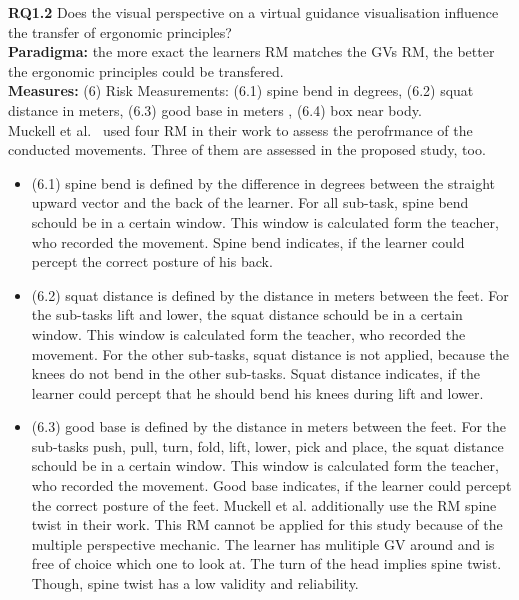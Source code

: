 \textbf{RQ1.2} Does the visual perspective on a virtual guidance visualisation influence the transfer of ergonomic principles?\\
\textbf{Paradigma:} the more exact the learners RM matches the GVs RM, the better the ergonomic principles could be transfered.\\
\textbf{Measures:} (6) Risk Measurements: (6.1) spine bend in degrees, (6.2) squat distance in meters, (6.3) good base in meters , (6.4) box near body.\\
Muckell et al.~\cite{muckell} used four RM in their work to assess the perofrmance of the conducted movements. Three of them are assessed in the proposed study, too.
\begin{itemize}
\item[] (6.1) spine bend is defined by the difference in degrees between the straight upward vector and the back of the learner. For all sub-task, spine bend schould be in a certain window. This window is calculated form the teacher, who recorded the movement. Spine bend indicates, if the learner could percept the correct posture of his back.

\item[] (6.2) squat distance is defined by the distance in meters between the feet. For the sub-tasks lift and lower, the squat distance schould be in a certain window. This window is calculated form the teacher, who recorded the movement. For the other sub-tasks, squat distance is not applied, because the knees do not bend in the other sub-tasks. Squat distance indicates, if the learner could percept that he should bend his knees during lift and lower.

\item[] (6.3) good base is defined by the distance in meters between the feet. For the sub-tasks push, pull, turn, fold, lift, lower, pick and place, the squat distance schould be in a certain window. This window is calculated form the teacher, who recorded the movement. Good base indicates, if the learner could percept the correct posture of the feet.
Muckell et al.\cite{muckell} additionally use the RM spine twist in their work. This RM cannot be applied for this study because of the multiple perspective mechanic. The learner has mulitiple GV around and is free of choice which one to look at. The turn of the head implies spine twist. Though, spine twist has a low validity and reliability.


\end{itemize}
